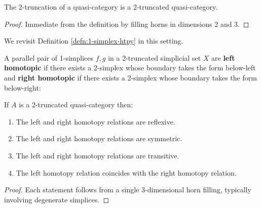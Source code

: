    \begin{lemma}\label{lem:2-truncated-qcat}
    \leanok
     The 2-truncation of a quasi-category is a 2-truncated quasi-category.
   \end{lemma}
   \begin{proof}
    \leanok
    Immediate from the definition by filling horns in dimensions 2 and 3.
   \end{proof}

   We revisit Definition \ref{defn:1-simplex-htpy} in this setting.

   \begin{definition}\label{defn:1-simplex-left-right-htpy}
    \leanok
     A parallel pair of 1-sim\-plices $f,g$ in a 2-truncated simplicial set $X$ are \textbf{left homotopic} if there exists a 2-simplex whose boundary takes the form below-left and \textbf{right homotopic} if there exists a 2-simplex whose boundary takes the form below-right:
     \begin{center}
     \end{center}     \begin{center}
    \end{center}
     \end{definition}

\begin{lemma}\label{lem:2-truncated-qcat-htpy}
   If $A$ is a 2-truncated quasi-category then:
  \begin{enumerate}
    \item The left and right homotopy relations are reflexive.
    \item The left and right homotopy relations are symmetric.
    \item The left and right homotopy relations are transitive.
    \item The left homotopy relation coincides with the right homotopy relation.
  \end{enumerate}
\end{lemma}
\begin{proof}
Each statement follows from a single 3-dimensional horn filling, typically involving degenerate simplices.
\end{proof}

